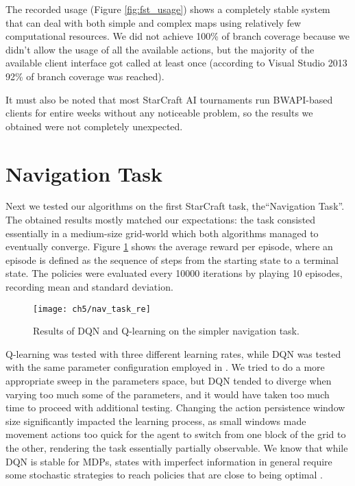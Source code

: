 The recorded usage (Figure \ref{fig:fst_usage}) shows a completely stable system
that can deal with both simple and complex maps using relatively few
computational resources. We did not achieve 100\% of branch coverage because we
didn't allow the usage of all the available actions, but the majority of the
available client interface got called at least once (according to Visual Studio
2013 92\% of branch coverage was reached).

It must also be noted that most StarCraft AI tournaments
\citep{ontanon2013survey} run BWAPI-based clients for entire weeks without any
noticeable problem, so the results we obtained were not completely unexpected.

\section{Navigation Task}

Next we tested our algorithms on the first StarCraft task, the``Navigation
Task''. The obtained results mostly matched our expectations: the task consisted
essentially in a medium-size grid-world which both algorithms managed to
eventually converge. Figure \ref{fig:nav_task_results} shows the average reward
per episode, where an episode is defined as the sequence of steps from the
starting state to a terminal state. The policies were evaluated every 10000
iterations by playing 10 episodes, recording mean and standard deviation.

\begin{figure}[h]
    \centering
    \texttt{[image: ch5/nav\_task\_re]}
    \caption{Results of DQN and Q-learning on the simpler navigation task.}
    \label{fig:nav_task_results}
\end{figure}

Q-learning was tested with three different learning rates, while DQN was tested
with the same parameter configuration employed in \cite{mnih2015human}. We tried
to do a more appropriate sweep in the parameters space, but DQN tended to
diverge when varying too much some of the parameters, and it would have taken
too much time to proceed with additional testing. Changing the action
persistence window size significantly impacted the learning process, as small
windows made movement actions too quick for the agent to switch from one block
of the grid to the other, rendering the task essentially partially observable.
We know that while DQN is stable for MDPs, states with imperfect information in
general require some stochastic strategies to reach policies that are close to
being optimal \citep{heinrich2016deep}.

